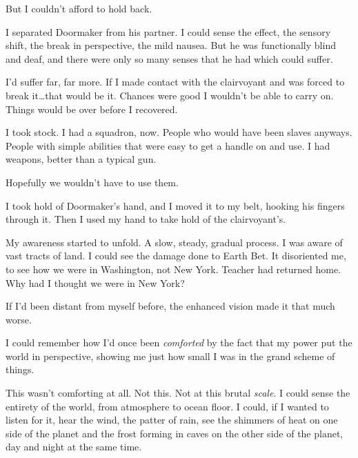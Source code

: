 But I couldn't afford to hold back.



I separated Doormaker from his partner.  I could sense the effect, the sensory shift, the break in perspective, the mild nausea.  But he was functionally blind and deaf, and there were only so many senses that he had which could suffer.



I'd suffer far, far more.  If I made contact with the clairvoyant and was forced to break it\ldots that would be it.  Chances were good I wouldn't be able to carry on.  Things would be over before I recovered.



I took stock.  I had a squadron, now.  People who would have been slaves anyways.  People with simple abilities that were easy to get a handle on and use.  I had weapons, better than a typical gun.



Hopefully we wouldn't have to use them.



I took hold of Doormaker's hand, and I moved it to my belt, hooking his fingers through it.  Then I used my hand to take hold of the clairvoyant's.



My awareness started to unfold.  A slow, steady, gradual process.  I was aware of vast tracts of land.  I could see the damage done to Earth Bet.  It disoriented me, to see how we were in Washington, not New York.  Teacher had returned home.  Why had I thought we were in New York?



If I'd been distant from myself before, the enhanced vision made it that much worse.



I could remember how I'd once been \emph{comforted} by the fact that my power put the world in perspective, showing me just how small I was in the grand scheme of things.



This wasn't comforting at all.  Not this.  Not at this brutal\emph{ scale}.  I could sense the entirety of the world, from atmosphere to ocean floor.  I could, if I wanted to listen for it, hear the wind, the patter of rain, see the shimmers of heat on one side of the planet and the frost forming in caves on the other side of the planet, day and night at the same time.



